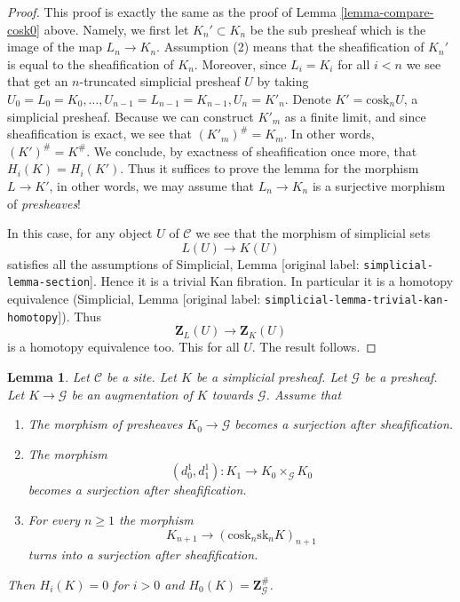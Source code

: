\documentclass[10pt,a4paper]{article}
\theoremstyle{plain}
\newtheorem{lemma}[subsection]{Lemma}
\theoremstyle{definition}
\theoremstyle{remark}
\numberwithin{equation}{subsection}
\begin{document}
\begin{proof}
This proof is exactly the same as the proof of
Lemma \ref{lemma-compare-cosk0} above. Namely,
we first let $K_n' \subset K_n$ be the sub presheaf
which is the image of the map $L_n \to K_n$. Assumption
(2) means that the sheafification of $K_n'$ is equal to
the sheafification of $K_n$. Moreover, since $L_i = K_i$
for all $i < n$ we see that get an $n$-truncated
simplicial presheaf $U$ by taking
$U_0 = L_0 = K_0, \ldots, U_{n - 1} = L_{n - 1} = K_{n - 1}, U_n = K'_n$.
Denote $K' = \text{cosk}_n U$, a simplicial presheaf.
Because we can construct $K'_m$ as a finite limit, and
since sheafification is exact, we see that
$(K'_m)^\# = K_m$. In other words, $(K')^\# = K^\#$.
We conclude, by exactness of sheafification once more,
that $H_i(K) = H_i(K')$. Thus it suffices to prove the lemma
for the morphism $L \to K'$, in other words, we may
assume that $L_n \to K_n$ is a surjective morphism
of {\it presheaves}!

\medskip\noindent
In this case, for any object $U$ of $\mathcal{C}$ we
see that the morphism of simplicial sets
$$
L(U) \longrightarrow K(U)
$$
satisfies all the assumptions of
Simplicial, Lemma \textnormal{[original label: \nolinkurl{simplicial-lemma-section}]}.
Hence it is a trivial Kan fibration. In particular it is
a homotopy equivalence
(Simplicial, Lemma \textnormal{[original label: \nolinkurl{simplicial-lemma-trivial-kan-homotopy}]}).
Thus
$$
\mathbf{Z}_L(U) \longrightarrow \mathbf{Z}_K(U)
$$
is a homotopy equivalence too. This for all $U$.
The result follows.
\end{proof}

\begin{lemma}
\label{lemma-acyclic-hypercover-sheaves}
Let $\mathcal{C}$ be a site.
Let $K$ be a simplicial presheaf.
Let $\mathcal{G}$ be a presheaf.
Let $K \to \mathcal{G}$ be an augmentation of $K$
towards $\mathcal{G}$. Assume that
\begin{enumerate}
\item The morphism of presheaves $K_0 \to \mathcal{G}$ becomes
a surjection after sheafification.
\item The morphism
$$
(d^1_0, d^1_1) :
K_1
\longrightarrow
K_0 \times_\mathcal{G} K_0
$$
becomes a surjection after sheafification.
\item For every $n \geq 1$ the morphism
$$
K_{n + 1} \longrightarrow (\text{cosk}_n \text{sk}_n K)_{n + 1}
$$
turns into a surjection after sheafification.
\end{enumerate}
Then $H_i(K) = 0$ for $i > 0$ and
$H_0(K) = \mathbf{Z}_\mathcal{G}^\#$.
\end{lemma}
\end{document}
